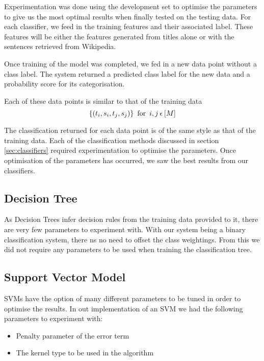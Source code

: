 \documentclass[bsc,frontabs,twoside,singlespacing,parskip,deptreport]{infthesis}     %
\begin{document}
Experimentation was done using the development set to optimise the parameters to give us the most optimal results
when finally tested on the testing data.
For each classifier, we feed in the training features and their associated label. These features will
be either the features generated from titles alone or with the sentences retrieved from Wikipedia.

Once training of the model was completed, we fed in a new data point without a class label.
The system returned a predicted class label for the new data and a probability score for its categorisation.

Each of these data points is similar to that of the training data
 \begin{equation}
   \{(t_{i},s_{i},t_{j},s_{j})\} \hspace{0.5em} \text{for} \hspace{0.5em} i,j \hspace{0.2em}\epsilon \hspace{0.2em}[M]\nonumber
 \end{equation}

 The classification returned for each data point is of the same style as that of the training data.
 Each of the classification methods discussed in section \ref{sec:classifiers} required experimentation to optimise the
 parameters. Once optimisation of the parameters has occurred, we saw the best results from our classifiers.

 \subsection{Decision Tree}
 As Decision Trees infer decision rules from the training data provided to it, there are very few parameters to
 experiment with. With our system being a binary classification system, there  ns no need to offset the class weightings.
 From this we did not require any parameters to be used when training the classification tree.
 
 \subsection{Support Vector Model}
 SVMs have the option of many different parameters to be tuned in order to optimise the results.
 In out implementation of an SVM we had the following parameters to experiment with:
 \begin{itemize}
 \item Penalty parameter of the error term
 \item The kernel type to be used in the algorithm
 \end{itemize}
\end{document}
